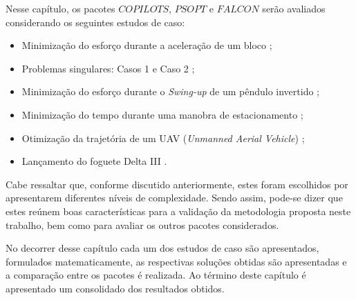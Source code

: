 Nesse capítulo, os  pacotes $ COPILOTS $, $ PSOPT $ e $ FALCON $ serão avaliados considerando os seguintes estudos de caso:
%
\begin{itemize}
\item Minimização do esforço durante a aceleração de um bloco \cite{becerra_optimal_2008};
\item Problemas singulares: Casos 1 e Caso 2 \cite{jacobson_computation_1970};
\item Minimização do esforço durante o \textit{Swing-up} de um pêndulo invertido \cite{kelly_introduction_2017};
\item Minimização do tempo durante uma manobra de estacionamento \cite{li_time-optimal_2016};
\item Otimização da trajetória de um UAV (\textit{Unmanned Aerial Vehicle}) \cite{toledo_de_azevedo_pseudospectral_2018};
\item Lançamento do foguete Delta III \cite{benson_gauss_2005}.
\end{itemize}

Cabe ressaltar que, conforme discutido anteriormente, estes foram escolhidos por apresentarem diferentes níveis de complexidade. Sendo assim, pode-se dizer que estes reúnem boas características para a validação da metodologia proposta neste trabalho, bem como para avaliar os outros pacotes considerados. 

No decorrer desse capítulo cada um dos estudos de caso são apresentados, formulados matematicamente, as respectivas soluções obtidas são apresentadas e a comparação entre os pacotes é realizada. Ao término deste capítulo é apresentado um consolidado dos resultados obtidos.